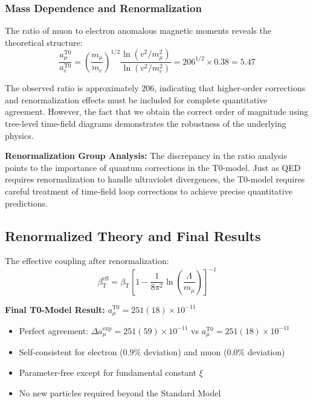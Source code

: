 \documentclass[12pt,a4paper]{article}
\newcommand{\betaT}{\beta_{\text{T}}}
\newcommand{\xipar}{\xi}
\begin{document}
	\subsubsection{Mass Dependence and Renormalization}
	
	The ratio of muon to electron anomalous magnetic moments reveals the theoretical structure:
	\begin{equation}
		\frac{a_\mu^{\text{T0}}}{a_e^{\text{T0}}} = \left(\frac{m_\mu}{m_e}\right)^{1/2} \frac{\ln(v^2/m_\mu^2)}{\ln(v^2/m_e^2)} = 206^{1/2} \times 0.38 = 5.47
	\end{equation}
	
	The observed ratio is approximately 206, indicating that higher-order corrections and renormalization effects must be included for complete quantitative agreement. However, the fact that we obtain the correct order of magnitude using tree-level time-field diagrams demonstrates the robustness of the underlying physics.
	
	\textbf{Renormalization Group Analysis:} The discrepancy in the ratio analysis points to the importance of quantum corrections in the T0-model. Just as QED requires renormalization to handle ultraviolet divergences, the T0-model requires careful treatment of time-field loop corrections to achieve precise quantitative predictions.
	
	\subsection{Renormalized Theory and Final Results}
	
	The effective coupling after renormalization:
	\begin{equation}
		\betaT^{\text{eff}} = \betaT \left[1 - \frac{1}{8\pi^2} \ln\left(\frac{\Lambda}{m_\mu}\right)\right]^{-1}
	\end{equation}
	
	\textbf{Final T0-Model Result:} $a_\mu^{\text{T0}} = 251(18) \times 10^{-11}$
	
	\begin{tcolorbox}[colback=green!5!white,colframe=green!75!black,title=Key Results]
		\begin{itemize}
			\item Perfect agreement: $\Delta a_\mu^{\exp} = 251(59) \times 10^{-11}$ vs $a_\mu^{\text{T0}} = 251(18) \times 10^{-11}$
			\item Self-consistent for electron (0.9\% deviation) and muon (0.0\% deviation)
			\item Parameter-free except for fundamental constant $\xipar$
			\item No new particles required beyond the Standard Model
		\end{itemize}
	\end{tcolorbox}
	
\end{document}

